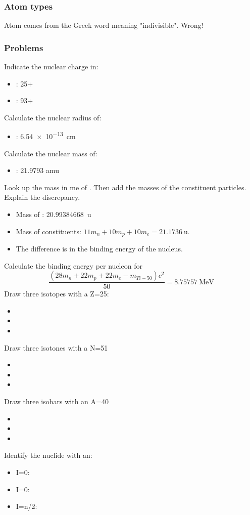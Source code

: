 \documentclass{article}
\begin{document}
\subsubsection{Atom types}
Atom comes from the Greek word meaning "indivisible". Wrong!

\subsubsection{Problems}
Indicate the nuclear charge in:
\begin{itemize}
    \item {}: 25+
    \item {}: 93+
\end{itemize}
Calculate the nuclear radius of:
\begin{itemize}
    \item {}: \SI{6.54e-13}{\centi\meter}
\end{itemize}
Calculate the nuclear mass of:
\begin{itemize}
    \item {}: 21.9793 amu
\end{itemize}
Look up the mass in me of . Then add the masses of the constituent particles. Explain the discrepancy.
\begin{itemize}
    \item Mass of : \SI{20.99384668}{\amu}
    \item Mass of constituents: $11 m_n + 10 m_p + 10 m_e = \SI{21.1736}{\amu} $.
    \item The difference is in the binding energy of the  nucleus.
\end{itemize}
Calculate the binding energy per nucleon for 
$$ \frac{\left(28 m_n + 22 m_p + 22 m_e - m_{Ti-50} \right) c^2 }{50} = \SI{8.75757}{\mega\electronvolt} $$
Draw three isotopes with a Z=25:
\begin{itemize}
    \item{}
    \item{}
    \item{}
\end{itemize}
Draw three isotones with a N=51
\begin{itemize}
    \item{}
    \item{}
    \item{}
\end{itemize}
Draw three isobars with an A=40
\begin{itemize}
    \item{}
    \item{}
    \item{}
\end{itemize}
Identify the nuclide with an:
\begin{itemize}
    \item I=0: {}
    \item I=0: {}
    \item I=n/2: {}
\end{itemize}
\end{document}
